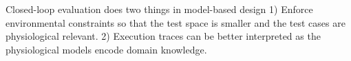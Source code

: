 Closed-loop evaluation does two things in model-based design 1) Enforce environmental constraints so that the test space is smaller and the test cases are physiological relevant. 2) Execution traces can be better interpreted as the physiological models encode domain knowledge. 
